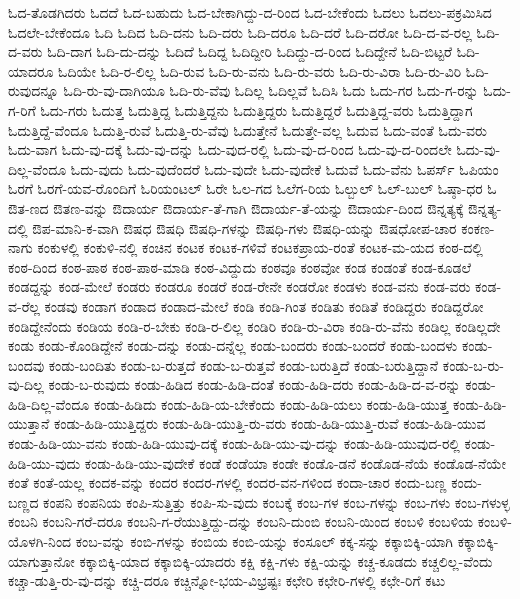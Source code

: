 {ಓದ-ತೊಡಗಿದರು
ಓದದೆ
ಓದ-ಬಹುದು
ಓದ-ಬೇಕಾಗಿದ್ದು-ದ-ರಿಂದ
ಓದ-ಬೇಕೆಂದು
ಓದಲು
ಓದಲು-ಪಕ್ರಮಿಸಿದ
ಓದಲೇ-ಬೇಕೆಂದೂ
ಓದಿ
ಓದಿದ
ಓದಿ-ದನು
ಓದಿ-ದರು
ಓದಿ-ದರೂ
ಓದಿ-ದರೆ
ಓದಿ-ದರೋ
ಓದಿ-ದ-ವ-ರಲ್ಲ
ಓದಿ-ದ-ವರು
ಓದಿ-ದಾಗ
ಓದಿ-ದು-ದನ್ನು
ಓದಿದೆ
ಓದಿದ್ದ
ಓದಿದ್ದೀರಿ
ಓದಿದ್ದು-ದ-ರಿಂದ
ಓದಿದ್ದೇನೆ
ಓದಿ-ಬಿಟ್ಟರೆ
ಓದಿ-ಯಾದರೂ
ಓದಿಯೇ
ಓದಿ-ರ-ಲಿಲ್ಲ
ಓದಿ-ರುವ
ಓದಿ-ರು-ವನು
ಓದಿ-ರು-ವರು
ಓದಿ-ರು-ವಿರಾ
ಓದಿ-ರು-ವಿರಿ
ಓದಿ-ರುವುದನ್ನೂ
ಓದಿ-ರು-ವು-ದಾಗಿಯೂ
ಓದಿ-ರು-ವೆವು
ಓದಿಲ್ಲ
ಓದಿಲ್ಲವೆ
ಓದಿಸಿ
ಓದು
ಓದು-ಗರ
ಓದು-ಗ-ರನ್ನು
ಓದು-ಗ-ರಿಗೆ
ಓದು-ಗರು
ಓದುತ್ತ
ಓದುತ್ತಿದ್ದ
ಓದುತ್ತಿದ್ದನು
ಓದುತ್ತಿದ್ದರು
ಓದುತ್ತಿದ್ದರೆ
ಓದುತ್ತಿದ್ದ-ವರು
ಓದುತ್ತಿದ್ದಾಗ
ಓದುತ್ತಿದ್ದೆ-ವೆಂದೂ
ಓದುತ್ತಿ-ರುವೆ
ಓದುತ್ತಿ-ರು-ವೆವು
ಓದುತ್ತೇನೆ
ಓದುತ್ತೇ-ವಲ್ಲ
ಓದುವ
ಓದು-ವಂತೆ
ಓದು-ವರು
ಓದು-ವಾಗ
ಓದು-ವು-ದಕ್ಕೆ
ಓದು-ವು-ದನ್ನು
ಓದು-ವುದ-ರಲ್ಲಿ
ಓದು-ವು-ದ-ರಿಂದ
ಓದು-ವು-ದ-ರಿಂದಲೇ
ಓದು-ವು-ದಿಲ್ಲ-ವೆಂದೂ
ಓದು-ವುದು
ಓದು-ವುದೆಂದರೆ
ಓದು-ವುದೇ
ಓದು-ವುದೇಕೆ
ಓದುವೆ
ಓದು-ವೆನು
ಓಪರ್ಸ್
ಓಪಿಯಂ
ಓರಗೆ
ಓರಗೆ-ಯವ-ರೊಂದಿಗೆ
ಓರಿಯಂಟಲ್
ಓರೇ
ಓಲ-ಗದ
ಓಲೆಗ-ರಿಯ
ಓಲ್ಬುಲ್
ಓಲ್-ಬುಲ್
ಓಷ್ಠಾ-ಧರ
ಓ
ಔತ-ಣದ
ಔತಣ-ವನ್ನು
ಔದಾರ್ಯ
ಔದಾರ್ಯ-ತೆ-ಗಾಗಿ
ಔದಾರ್ಯ-ತೆ-ಯನ್ನು
ಔದಾರ್ಯ-ದಿಂದ
ಔನ್ನತ್ಯಕ್ಕೆ
ಔನ್ನತ್ಯ-ದಲ್ಲಿ
ಔಪ-ಮಾನಿ-ಕ-ವಾಗಿ
ಔಷಧ
ಔಷಧಿ
ಔಷಧಿ-ಗಳನ್ನು
ಔಷಧಿ-ಗಳು
ಔಷಧಿ-ಯನ್ನು
ಔಷಧೋಪ-ಚಾರ
ಕಂಕಣ-ನಾಗು
ಕಂಕುಳಲ್ಲಿ
ಕಂಕುಳಿ-ನಲ್ಲಿ
ಕಂಚಿನ
ಕಂಟಕ
ಕಂಟಕ-ಗಳಿವೆ
ಕಂಟಕಪ್ರಾಯ-ರಂತೆ
ಕಂಟಕ-ಮ-ಯದ
ಕಂಠ-ದಲ್ಲಿ
ಕಂಠ-ದಿಂದ
ಕಂಠ-ಪಾಠ
ಕಂಠ-ಪಾಠ-ಮಾಡಿ
ಕಂಠ-ವಿದ್ದುದು
ಕಂಠವೂ
ಕಂಠವೋ
ಕಂಡ
ಕಂಡಂತೆ
ಕಂಡ-ಕೂಡಲೆ
ಕಂಡದ್ದನ್ನು
ಕಂಡ-ಮೇಲೆ
ಕಂಡರು
ಕಂಡರೂ
ಕಂಡರೆ
ಕಂಡ-ರೇನೇ
ಕಂಡರೋ
ಕಂಡಳು
ಕಂಡ-ವನು
ಕಂಡ-ವರು
ಕಂಡ-ವ-ರೆಲ್ಲ
ಕಂಡವು
ಕಂಡಾಗ
ಕಂಡಾದ
ಕಂಡಾದ-ಮೇಲೆ
ಕಂಡಿ
ಕಂಡಿ-ಗಿಂತ
ಕಂಡಿತು
ಕಂಡಿತೆ
ಕಂಡಿದ್ದರು
ಕಂಡಿದ್ದರೋ
ಕಂಡಿದ್ದೇನೆಂದು
ಕಂಡಿಯ
ಕಂಡಿ-ರ-ಬೇಕು
ಕಂಡಿ-ರ-ಲಿಲ್ಲ
ಕಂಡಿರಿ
ಕಂಡಿ-ರು-ವಿರಾ
ಕಂಡಿ-ರು-ವೆನು
ಕಂಡಿಲ್ಲ
ಕಂಡಿಲ್ಲದೇ
ಕಂಡು
ಕಂಡು-ಕೊಂಡಿದ್ದೇನೆ
ಕಂಡು-ದನ್ನು
ಕಂಡು-ದನ್ನೆಲ್ಲ
ಕಂಡು-ಬಂದರು
ಕಂಡು-ಬಂದರೆ
ಕಂಡು-ಬಂದಳು
ಕಂಡು-ಬಂದವು
ಕಂಡು-ಬಂದಿತು
ಕಂಡು-ಬ-ರುತ್ತದೆ
ಕಂಡು-ಬ-ರುತ್ತವೆ
ಕಂಡು-ಬರುತ್ತಿದೆ
ಕಂಡು-ಬರುತ್ತಿದ್ದಾನೆ
ಕಂಡು-ಬ-ರು-ವು-ದಿಲ್ಲ
ಕಂಡು-ಬ-ರುವುದು
ಕಂಡು-ಹಿಡಿದ
ಕಂಡು-ಹಿಡಿ-ದಂತೆ
ಕಂಡು-ಹಿಡಿ-ದರು
ಕಂಡು-ಹಿಡಿ-ದ-ವ-ರನ್ನು
ಕಂಡು-ಹಿಡಿ-ದಿಲ್ಲ-ವೆಂದೂ
ಕಂಡು-ಹಿಡಿದು
ಕಂಡು-ಹಿಡಿ-ಯ-ಬೇಕೆಂದು
ಕಂಡು-ಹಿಡಿ-ಯಲು
ಕಂಡು-ಹಿಡಿ-ಯುತ್ತ
ಕಂಡು-ಹಿಡಿ-ಯುತ್ತಾನೆ
ಕಂಡು-ಹಿಡಿ-ಯುತ್ತಿದ್ದರು
ಕಂಡು-ಹಿಡಿ-ಯುತ್ತಿ-ರು-ವರು
ಕಂಡು-ಹಿಡಿ-ಯುತ್ತಿ-ರುವೆ
ಕಂಡು-ಹಿಡಿ-ಯುವ
ಕಂಡು-ಹಿಡಿ-ಯು-ವನು
ಕಂಡು-ಹಿಡಿ-ಯುವು-ದಕ್ಕೆ
ಕಂಡು-ಹಿಡಿ-ಯು-ವು-ದನ್ನು
ಕಂಡು-ಹಿಡಿ-ಯುವುದ-ರಲ್ಲಿ
ಕಂಡು-ಹಿಡಿ-ಯು-ವುದು
ಕಂಡು-ಹಿಡಿ-ಯು-ವುದೇಕೆ
ಕಂಡೆ
ಕಂಡೆಯಾ
ಕಂಡೇ
ಕಂಡೊ-ಡನೆ
ಕಂಡೊಡ-ನೆಯೆ
ಕಂಡೊಡ-ನೆಯೇ
ಕಂತೆ
ಕಂತೆ-ಯಲ್ಲ
ಕಂದಕ-ವನ್ನು
ಕಂದರ
ಕಂದರ-ಗಳಲ್ಲಿ
ಕಂದರ-ವನ-ಗಳಿಂದ
ಕಂದಾ-ಚಾರ
ಕಂದು-ಬಣ್ಣ
ಕಂದು-ಬಣ್ಣದ
ಕಂಪನಿ
ಕಂಪನಿಯ
ಕಂಪಿ-ಸುತ್ತಿತ್ತು
ಕಂಪಿ-ಸು-ವುದು
ಕಂಬಕ್ಕೆ
ಕಂಬ-ಗಳ
ಕಂಬ-ಗಳನ್ನು
ಕಂಬ-ಗಳು
ಕಂಬ-ಗಳುಳ್ಳ
ಕಂಬನಿ
ಕಂಬನಿ-ಗರೆ-ದರೂ
ಕಂಬನಿ-ಗ-ರೆಯುತ್ತಿದ್ದು-ದನ್ನು
ಕಂಬನಿ-ದುಂಬಿ
ಕಂಬನಿ-ಯಿಂದ
ಕಂಬಳಿ
ಕಂಬಳಿಯ
ಕಂಬಳಿ-ಯೊಳಗಿ-ನಿಂದ
ಕಂಬ-ವನ್ನು
ಕಂಬಿ-ಗಳನ್ನು
ಕಂಬಿಯ
ಕಂಬಿ-ಯನ್ನು
ಕಂಸೂಲ್
ಕಕ್ಕ-ಸನ್ನು
ಕಕ್ಕಾಬಿಕ್ಕಿ-ಯಾಗಿ
ಕಕ್ಕಾಬಿಕ್ಕಿ-ಯಾಗುತ್ತಾನೋ
ಕಕ್ಕಾಬಿಕ್ಕಿ-ಯಾದ
ಕಕ್ಕಾಬಿಕ್ಕಿ-ಯಾದರು
ಕಕ್ಷಿ
ಕಕ್ಷಿ-ಗಳು
ಕಕ್ಷಿ-ಯನ್ನು
ಕಚ್ಚ-ಕೂಡದು
ಕಚ್ಚಲಿಲ್ಲ-ವೆಂದು
ಕಚ್ಚಾ-ಡುತ್ತಿ-ರು-ವು-ದನ್ನು
ಕಚ್ಚಿ-ದರೂ
ಕಚ್ಚಿನ್ನೋ-ಭಯ-ವಿಭ್ರಷ್ಟಃ
ಕಛೇರಿ
ಕಛೇರಿ-ಗಳಲ್ಲಿ
ಕಛೇ-ರಿಗೆ
ಕಟು
}
